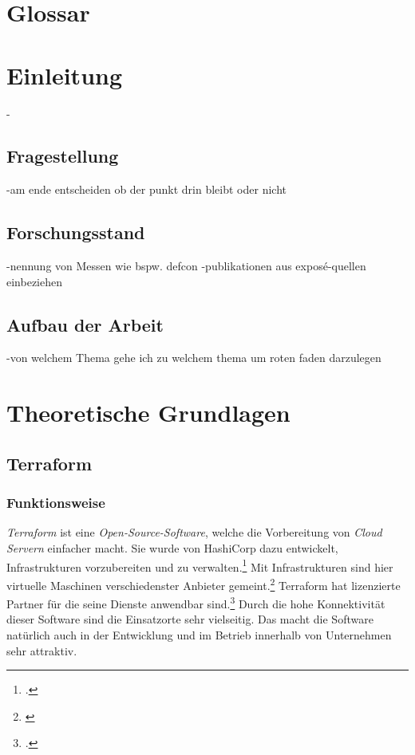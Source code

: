 \documentclass[12pt,oneside]{article}
\begin{document}
\section*{Glossar} 
\begin{acronym}
\end{acronym}
\clearpage
{}  
    \setcounter{page}{1}
\lhead{\nouppercase{\leftmark}}

\section{Einleitung} 
-
\subsection{Fragestellung}
-am ende entscheiden ob der punkt drin bleibt oder nicht
\subsection{Forschungsstand}
-nennung von Messen wie bspw. defcon
\newline
-publikationen aus exposé-quellen einbeziehen
\subsection{Aufbau der Arbeit}
-von welchem Thema gehe ich zu welchem thema um roten faden darzulegen
\newpage

\section{Theoretische Grundlagen} 
\subsection{Terraform}
\subsubsection{Funktionsweise}
\textit{Terraform} ist eine \textit{Open-Source-Software}, welche die Vorbereitung von \textit{Cloud Servern} einfacher macht. Sie wurde von HashiCorp dazu entwickelt, Infrastrukturen vorzubereiten und zu verwalten.\footcite{introform} Mit Infrastrukturen sind hier virtuelle Maschinen verschiedenster Anbieter gemeint.\footnote{\cite{Terraform}} Terraform hat lizenzierte Partner für die seine Dienste anwendbar sind.\footcite{TerraProviders} Durch die hohe Konnektivität dieser Software sind die Einsatzorte sehr vielseitig. Das macht die Software natürlich auch in der Entwicklung und im Betrieb innerhalb von Unternehmen sehr attraktiv. 
\end{document}
